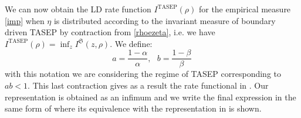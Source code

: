 \documentclass[reqno]{amsart}
\theoremstyle{plain}
\theoremstyle{definition}
\theoremstyle{remark}
\numberwithin{equation}{section}
\numberwithin{theorem}{section}
\newcommand{\<}{\langle}
\renewcommand{\>}{\rangle}
\begin{document}
	We can now obtain the LD rate function $I^{\mathrm{TASEP}}(\rho)$ for the empirical measure \eqref{imp} when $\eta$ is distributed according to the invariant measure of boundary driven TASEP by contraction from \eqref{rhoezeta}, i.e. we have $I^{\mathrm{TASEP}}(\rho)=\inf_z 	I^{\mathfrak S}(z,\rho)$. 
	We define: 
	\begin{equation*}
		a=\frac{1-\alpha}{\alpha}, \ \ \ b=\frac{1-\beta}{\beta}\,
	\end{equation*}
	with this notation we are  considering the regime of TASEP corresponding to $ab<1$.
	This last contraction gives as a result the rate functional in \cite{Der4, Derr7}. Our representation is obtained as an infimum and we write the final expression in the same form of \cite{Bryc} where its equivalence with the representation in \cite{Der4, Derr7} is shown.
	
\end{document}
